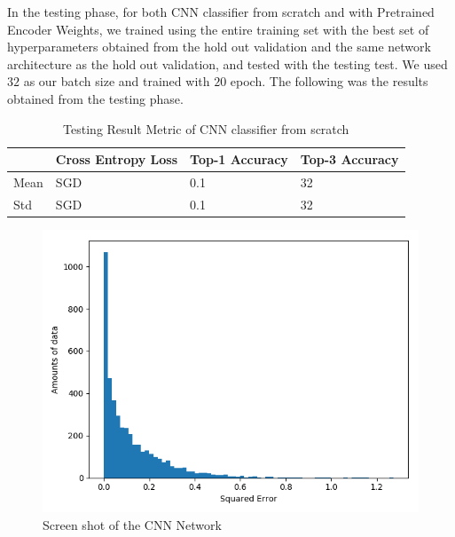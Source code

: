 \documentclass{article}
\begin{document}
In the testing phase, for both CNN classifier from scratch and with Pretrained Encoder Weights, we trained using the entire training set with the best set of hyperparameters obtained from the hold out validation and the same network architecture as the hold out validation, and tested with the testing test. We used $32$ as our batch size and trained with $20$ epoch. The following was the results obtained from the testing phase.

\begin{table}[htb]
\caption{Testing Result Metric of CNN classifier from scratch}
	\label{sample-table}
	\centering
\begin{tabular}{llll}
\toprule
		\cmidrule{1-4}
		& Cross Entropy Loss & Top-1 Accuracy & Top-3 Accuracy 		\\
	\midrule
 	Mean & SGD & 0.1 & 32 \\
 	Std & SGD & 0.1 & 32\\
\bottomrule
\end{tabular}
\end{table}


\pagebreak

\begin{figure}[h]
  \centering
  \includegraphics[scale=0.3]{fifa_lg.png}
  \caption{Screen shot of the CNN Network}
\end{figure}
\end{document}
